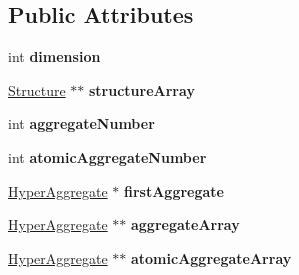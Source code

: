 \subsection*{Public Attributes}
\begin{DoxyCompactItemize}
\item 
\hypertarget{classHyperStructure_abc4a643b5fa8c16780ecf974937f2ac7}{int {\bfseries dimension}}\label{classHyperStructure_abc4a643b5fa8c16780ecf974937f2ac7}

\item 
\hypertarget{classHyperStructure_ab22f6fdc92a19631df6a441cebeface2}{\hyperlink{classStructure}{Structure} $\ast$$\ast$ {\bfseries structure\-Array}}\label{classHyperStructure_ab22f6fdc92a19631df6a441cebeface2}

\item 
\hypertarget{classHyperStructure_a6cbb490265b727e9f97f1c7d96e65e7d}{int {\bfseries aggregate\-Number}}\label{classHyperStructure_a6cbb490265b727e9f97f1c7d96e65e7d}

\item 
\hypertarget{classHyperStructure_a40fb083f90d1fb3e55d4f7f6821122ea}{int {\bfseries atomic\-Aggregate\-Number}}\label{classHyperStructure_a40fb083f90d1fb3e55d4f7f6821122ea}

\item 
\hypertarget{classHyperStructure_a01a5667aaf40c9f65986150276f6722d}{\hyperlink{classHyperAggregate}{Hyper\-Aggregate} $\ast$ {\bfseries first\-Aggregate}}\label{classHyperStructure_a01a5667aaf40c9f65986150276f6722d}

\item 
\hypertarget{classHyperStructure_addfd80e0935eff4449b3db744144c1c7}{\hyperlink{classHyperAggregate}{Hyper\-Aggregate} $\ast$$\ast$ {\bfseries aggregate\-Array}}\label{classHyperStructure_addfd80e0935eff4449b3db744144c1c7}

\item 
\hypertarget{classHyperStructure_a668c11c20fb93fd9dfad8db4335b4b55}{\hyperlink{classHyperAggregate}{Hyper\-Aggregate} $\ast$$\ast$ {\bfseries atomic\-Aggregate\-Array}}\label{classHyperStructure_a668c11c20fb93fd9dfad8db4335b4b55}

\end{DoxyCompactItemize}



